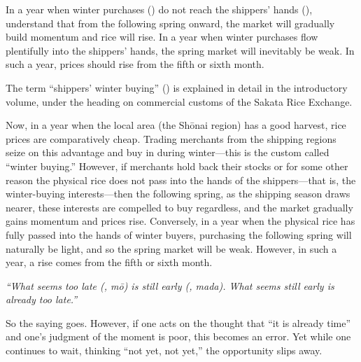 
\begin{sokyubox}
{\small\itshape\color{sokyubar} }

\medskip
In a year when winter purchases () do not reach the
shippers' hands (), understand that from the following
spring onward, the market will gradually build momentum and rice will
rise. In a year when winter purchases flow plentifully into the shippers'
hands, the spring market will inevitably be weak. In such a year, prices
should rise from the fifth or sixth month.
\end{sokyubox}

\commentary
The term ``shippers' winter buying'' () is explained in
detail in the introductory volume, under the heading on commercial customs
of the Sakata Rice Exchange.

Now, in a year when the local area (the Sh\=onai region) has a good
harvest, rice prices are comparatively cheap. Trading merchants from the
shipping regions seize on this advantage and buy in during winter---this
is the custom called ``winter buying.'' However, if merchants hold back
their stocks or for some other reason the physical rice does not pass into
the hands of the shippers---that is, the winter-buying interests---then
the following spring, as the shipping season draws nearer, these interests
are compelled to buy regardless, and the market gradually gains momentum
and prices rise. Conversely, in a year when the physical rice has fully
passed into the hands of winter buyers, purchasing the following spring
will naturally be light, and so the spring market will be weak. However,
in such a year, a rise comes from the fifth or sixth month.


\begin{sokyubox}
{\small\itshape\color{sokyubar} }

\medskip
\textit{``What seems too late (, m\=o) is still early (,
mada). What seems still early is already too late.''}

So the saying goes. However, if one acts on the thought that ``it is
already time'' and one's judgment of the moment is poor, this becomes an
error. Yet while one continues to wait, thinking ``not yet, not yet,'' the
opportunity slips away.
\end{sokyubox}

